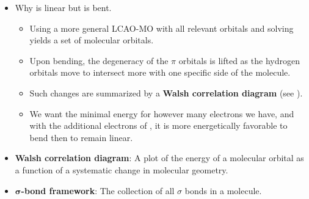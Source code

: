\documentclass[../notes.tex]{subfiles}
\begin{document}
\begin{itemize}
\begin{itemize}
    \end{itemize}
    \item Why  is linear but  is bent.
    \begin{itemize}
        \item Using a more general LCAO-MO with all relevant orbitals and solving yields a set of molecular orbitals.
        \item Upon bending, the degeneracy of the $\pi$ orbitals is lifted as the hydrogen orbitals move to intersect more with one specific side of the molecule.
        \item Such changes are summarized by a \textbf{Walsh correlation diagram} (see \textcite[65]{bib:IChemNotes}).
        \item We want the minimal energy for however many electrons we have, and with the additional electrons of , it is more energetically favorable to bend then to remain linear.
    \end{itemize}
    \item \textbf{Walsh correlation diagram}: A plot of the energy of a molecular orbital as a function of a systematic change in molecular geometry.
    \item \textbf{$\bm{\sigma}$-bond framework}: The collection of all $\sigma$ bonds in a molecule.
\end{itemize}
\end{document}
